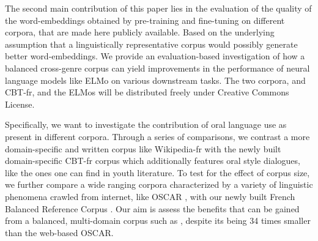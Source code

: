 The second main contribution of this paper lies in the evaluation of the quality of the word-embeddings obtained by pre-training and fine-tuning on different corpora, that are made here publicly available.
Based on the underlying assumption that a linguistically representative corpus would possibly generate better word-embeddings. %
We provide an evaluation-based investigation of how a balanced cross-genre corpus can yield improvements in the performance of neural language models like ELMo \citep{peters-etal-2018-deep} on various downstream tasks.
The two corpora, \Cabernet and CBT-fr, and the ELMos will be distributed freely under Creative Commons License.

Specifically, we want to investigate the contribution of oral language use as present in different corpora. Through a series of comparisons, we contrast a more domain-specific and written corpus like Wikipedia-fr with the newly built domain-specific CBT-fr corpus which additionally features oral style dialogues, like the ones one can find in youth literature. To test for the effect of corpus size, we further compare a wide ranging corpora characterized by a variety of linguistic phenomena crawled from internet, like OSCAR \citep{ortiz-suarez-etal-2019-asynchronous}, with our newly built French Balanced Reference Corpus \Cabernet.
Our aim is assess the benefits that can be gained from a balanced, multi-domain corpus such as \Cabernet, despite its being 34 times smaller than the web-based OSCAR.


